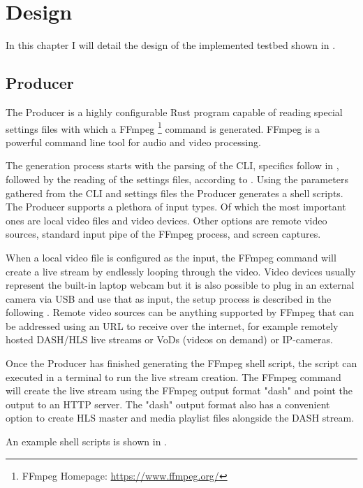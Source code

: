 \chapter{Design\label{cha:chapter4}}

In this chapter I will detail the design of the implemented testbed shown in . 

\section{Producer\label{sec:producer}}

The Producer is a highly configurable Rust program capable of reading special settings files with which a FFmpeg \footnote{FFmpeg Homepage: \url{https://www.ffmpeg.org/}} command is generated. FFmpeg is a powerful command line tool for audio and video processing.

The generation process starts with the parsing of the CLI, specifics follow in , followed by the reading of the settings files, according to . Using the parameters gathered from the CLI and settings files the Producer generates a shell scripts. The Producer supports a plethora of input types. Of which the most important ones are local video files and video devices. Other options are remote video sources, standard input pipe of the FFmpeg process, and screen captures.

When a local video file is configured as the input, the FFmpeg command will create a live stream by endlessly looping through the video. Video devices usually represent the built-in laptop webcam but it is also possible to plug in an external camera via USB and use that as input, the setup process is described in the following . Remote video sources can be anything supported by FFmpeg that can be addressed using an URL to receive over the internet, for example remotely hosted DASH/HLS live streams or VoDs (videos on demand) or IP-cameras.

Once the Producer has finished generating the FFmpeg shell script, the script can executed in a terminal to run the live stream creation. The FFmpeg command will create the live stream using the FFmpeg output format "dash" and point the output to an HTTP server. The "dash" output format also has a convenient option to create HLS master and media playlist files alongside the DASH stream. 

An example shell scripts is shown in .

